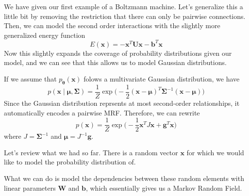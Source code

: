 \documentclass{article}
\begin{document}
    We have given our first example of a Boltzmann machine. Let's generalize this a little bit by removing the restriction that there can only be pairwise connections. Then, we can model the second order interactions with the slightly more generalized energy function
      \[E(\mathbf{x}) = -\mathbf{x}^T \mathbf{U} \mathbf{x} - \mathbf{b}^T \mathbf{x}\]
    Now this slightly expands the coverage of probability distributions given our model, and we can see that this allows us to model Gaussian distributions. 

    \begin{example} 
      If we assume that $p_{\boldsymbol{\theta}} ( \mathbf{x})$ folows a multivariate Gaussian distribution, we have 
        \[p(\mathbf{x} \mid \boldsymbol{\mu}, \boldsymbol{\Sigma}) = \frac{1}{Z} \exp \bigg( -\frac{1}{2} (\mathbf{x} - \boldsymbol{\mu})^T \boldsymbol{\Sigma}^{-1} (\mathbf{x} - \boldsymbol{\mu}) \bigg)\]
      Since the Gaussian distribution reprsents at most second-order relationships, it automatically encodes a pairwise MRF. Therefore, we can rewrite 
        \[p(\mathbf{x}) = \frac{1}{Z} \exp \bigg( -\frac{1}{2} \mathbf{x}^T J\mathbf{x} + \mathbf{g}^T \mathbf{x} \bigg)\] 
      where $J = \boldsymbol{\Sigma}^{-1}$ and $\boldsymbol{\mu} = J^{-1} \mathbf{g}$. 
    \end{example}

    Let's review what we had so far. There is a random vector $\mathbf{x}$ for which we would like to model the probability distribution of. 

    \begin{center}
    \end{center}

    What we can do is model the dependencies between these random elements with linear parameters $\mathbf{W}$ and $\mathbf{b}$, which essentially gives us a Markov Random Field.  
\end{document}
